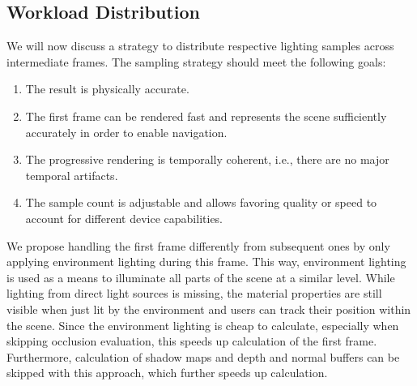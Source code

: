 \documentclass[sigconf,authorversion]{acmart}
\begin{document}
\subsection{Workload Distribution}
\label{subsec:workload_distribution}
We will now discuss a strategy to distribute respective lighting samples across intermediate frames.
The sampling strategy should meet the following goals:
\begin{enumerate}
    \item The result is physically accurate.
    \item The first frame can be rendered fast and represents the scene sufficiently accurately in order to enable navigation.
    \item The progressive rendering is temporally coherent, i.e., there are no major temporal artifacts.
    \item The sample count is adjustable and allows favoring quality or speed to account for different device capabilities.
\end{enumerate}
We propose handling the first frame differently from subsequent ones by only applying environment lighting during this frame.
This way, environment lighting is used as a means to illuminate all parts of the scene at a similar level.
While lighting from direct light sources is missing, the material properties are still visible when just lit by the environment and users can track their position within the scene.
Since the environment lighting is cheap to calculate, especially when skipping occlusion evaluation, this speeds up calculation of the first frame.
Furthermore, calculation of shadow maps and depth and normal buffers can be skipped with this approach, which further speeds up calculation.
\end{document}
